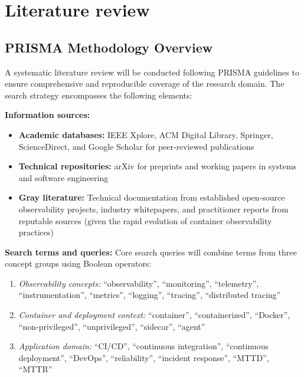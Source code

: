 
\chapter{Literature review} %
\label{chap:Chapter3} %

\section{PRISMA Methodology Overview}
A systematic literature review will be conducted following \ac{PRISMA} guidelines to ensure comprehensive and reproducible coverage of the research domain. The search strategy encompasses the following elements:

\textbf{Information sources:}
\begin{itemize}
    \item \textbf{Academic databases:} IEEE Xplore, ACM Digital Library, Springer, ScienceDirect, and Google Scholar for peer‑reviewed publications
    \item \textbf{Technical repositories:} arXiv for preprints and working papers in systems and software engineering
    \item \textbf{Gray literature:} Technical documentation from established open‑source observability projects, industry whitepapers, and practitioner reports from reputable sources (given the rapid evolution of container observability practices)
\end{itemize}

\textbf{Search terms and queries:}
Core search queries will combine terms from three concept groups using Boolean operators:
\begin{enumerate}
    \item \textit{Observability concepts:} ``observability'', ``monitoring'', ``telemetry'', ``instrumentation'', ``metrics'', ``logging'', ``tracing'', ``distributed tracing''
    \item \textit{Container and deployment context:} ``container'', ``containerized'', ``Docker'', ``non‑privileged'', ``unprivileged'', ``sidecar'', ``agent''
    \item \textit{Application domain:} ``CI/CD'', ``continuous integration'', ``continuous deployment'', ``DevOps'', ``reliability'', ``incident response'', ``MTTD'', ``MTTR''
\end{enumerate}

